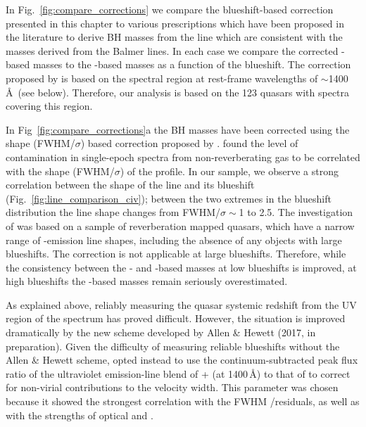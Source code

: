 In Fig.~\ref{fig:compare_corrections} we compare the  blueshift-based correction presented in this chapter to various prescriptions which have been proposed in the literature to derive BH masses from the  line which are consistent with the masses derived from the Balmer lines. 
In each case we compare the corrected -based masses to the \hans-based masses as a function of the  blueshift. 
The correction proposed by \citet{runnoe13} is based on the spectral region at rest-frame wavelengths of $\sim$1400\,\AA \ (see below). 
Therefore, our analysis is based on the 123 quasars with spectra covering this region. 

In Fig~\ref{fig:compare_corrections}a the  BH masses have been corrected using the  shape (FWHM/$\sigma$) based correction proposed by \citet{denney12}. 
\citet{denney12} found the level of contamination in single-epoch spectra from non-reverberating gas to be correlated with the shape (FWHM/$\sigma$) of the  profile. 
In our sample, we observe a strong correlation between the shape of the  line and its blueshift (Fig.~\ref{fig:line_comparison_civ}); between the two extremes in the  blueshift distribution the line shape changes from FWHM/$\sigma\sim$1 to 2.5. 
The investigation of \citet{denney12} was based on a sample of reverberation mapped quasars, which have a narrow range of -emission line shapes, including the absence of any objects with large  blueshifts. 
The correction is not applicable at large  blueshifts. 
Therefore, while the consistency between the \hans- and -based masses at low  blueshifts is improved, at high  blueshifts the -based masses remain seriously overestimated.

As explained above, reliably measuring the quasar systemic redshift from the UV region of the spectrum has proved difficult. 
However, the situation is improved dramatically by the new scheme developed by Allen \& Hewett (2017, in preparation). 
Given the difficulty of measuring reliable  blueshifts without the Allen \& Hewett scheme, \citet{runnoe13} opted instead to use the continuum-subtracted peak flux ratio of the ultraviolet emission-line blend of + (at 1400\,\AA) to that of  to correct for non-virial contributions to the  velocity width. 
This parameter was chosen because it showed the strongest correlation with the FWHM /\hb residuals, as well as with the strengths of optical  and . 

